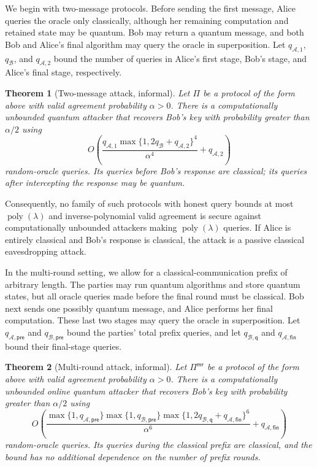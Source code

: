 \documentclass[11pt]{article}
\newcounter{algorithm}
\newtheorem{theorem}{Theorem}[section]
\newcommand{\cA}{\mathcal{A}}
\newcommand{\cB}{\mathcal{B}}
\newcommand{\poly}{\operatorname{poly}}
\begin{document}
We begin with two-message protocols. Before sending the first message, Alice
queries the oracle only classically, although her remaining computation and
retained state may be quantum. Bob may return a quantum message, and both Bob
and Alice's final algorithm may query the oracle in superposition. Let
\(q_{\cA,1}\), \(q_{\cB}\), and \(q_{\cA,2}\) bound the number of queries
in Alice's first stage, Bob's stage, and Alice's final stage, respectively.

\begin{theorem}[Two-message attack, informal]
\label{thm:informal-two-message}
Let \(\Pi\) be a protocol of the form above with valid agreement probability
\(\alpha>0\).  There is a computationally unbounded quantum attacker that
recovers Bob's key with probability greater than \(\alpha/2\) using
\[
  O\!\left(
    \frac{
      q_{\cA,1}\max\{1,2q_{\cB}+q_{\cA,2}\}^{4}}
      {\alpha^{4}}
    +q_{\cA,2}
  \right)
\]
random-oracle queries.  Its queries before Bob's response are classical;
its queries after intercepting the response may be quantum.
\end{theorem}

Consequently, no family of such protocols with honest query bounds at most
\(\poly(\lambda)\) and inverse-polynomial valid agreement is secure against
computationally unbounded attackers making \(\poly(\lambda)\) queries. If Alice is
entirely classical and Bob's response is classical, the attack is a passive
classical eavesdropping attack.

In the multi-round setting, we allow for a classical-communication prefix of arbitrary length. The parties may
run quantum algorithms and store quantum states, but all oracle queries made before the final round must be classical. Bob next sends one possibly quantum message, and
Alice performs her final computation. These last two stages may query the
oracle in superposition. Let
\(q_{\cA,\mathsf{pre}}\) and \(q_{\cB,\mathsf{pre}}\) bound the parties'
total prefix queries, and let \(q_{\cB,\mathsf q}\) and
\(q_{\cA,\mathsf{fin}}\) bound their final-stage queries.

\begin{theorem}[Multi-round attack, informal]
\label{thm:informal-multi-round}
Let \(\Pi^{\mathsf{mr}}\) be a protocol of the form above with valid
agreement probability \(\alpha>0\).  There is a computationally unbounded
online quantum attacker that recovers Bob's key with probability greater
than \(\alpha/2\) using
\[
  O\!\left(
    \frac{
      \max\{1,q_{\cA,\mathsf{pre}}\}
      \max\{1,q_{\cB,\mathsf{pre}}\}
      \max\{1,2q_{\cB,\mathsf q}+q_{\cA,\mathsf{fin}}\}^{6}}
      {\alpha^{6}}
    +q_{\cA,\mathsf{fin}}
  \right)
\]
random-oracle queries.  Its queries during the classical prefix are
classical, and the bound has no additional dependence on the number of
prefix rounds.
\end{theorem}
\end{document}
